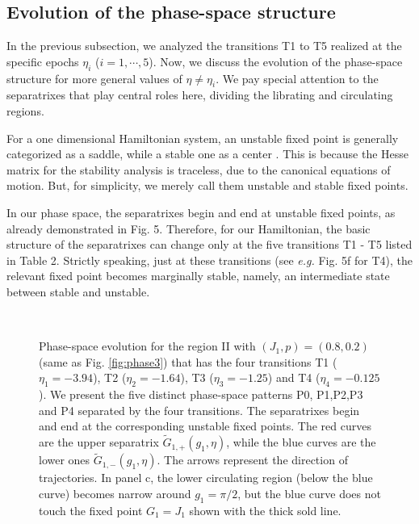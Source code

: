 \documentclass[useAMS,usenatbib,twocolumn]{mn2e}
\begin{document}
\subsection{Evolution of the phase-space structure}

In the previous subsection, we analyzed the transitions T1 to T5 realized at the specific epochs $\eta_i$ ($i=1,\cdots,5$). 
Now, we discuss the evolution of  the phase-space structure for more general values of $\eta\ne \eta_i$.  We  pay special attention to the separatrixes that play central roles here,  dividing  the librating and circulating regions.  

For a one dimensional Hamiltonian system, 
 an unstable fixed point  is generally   categorized as a saddle, while a stable one as a center \citep{Strogatz}.
This is because the Hesse matrix for the stability analysis is traceless, due to the canonical equations of motion.
But,  for simplicity,  we merely call them unstable and stable fixed points. 

 In our phase space, the separatrixes begin and end at  unstable fixed points, as already demonstrated in Fig. 5. 
Therefore, for our Hamiltonian, the basic structure of the separatrixes can change only  at the five transitions T1 - T5 listed
 in Table 2. Strictly speaking, just at these transitions (see {\it e.g.} Fig. 5f for T4),  the relevant fixed point  becomes marginally stable, namely, an intermediate state between stable and unstable.



\begin{figure*}
\begin{center}
\\
\caption{Phase-space evolution  for the region II with $(J_1,p)=(0.8,0.2)$   (same as Fig. \ref{fig:phase3})   that has the four transitions T1 ($\eta_1=-3.94$), T2 ($\eta_2=-1.64$), T3 ($\eta_3=-1.25$) and T4 ($\eta_4=-0.125$). We present the five distinct phase-space patterns P0, P1,P2,P3 and P4 separated by the four transitions.
The separatrixes begin and end at the corresponding unstable fixed points.  The red curves are the upper separatrix $\tilde{G}_{1,+}(g_1,\eta)$, while the blue curves are the lower ones $\tilde{G}_{1,-}(g_1,\eta)$.
 The arrows represent the direction of trajectories.  In panel c, the lower circulating region (below the blue curve) becomes narrow around $g_1=\pi/2$, but the blue curve does not touch the fixed point $G_1=J_1$ shown with the thick sold line.   
}
\label{fig:phase4}
\end{center}
\end{figure*}
\end{document}
